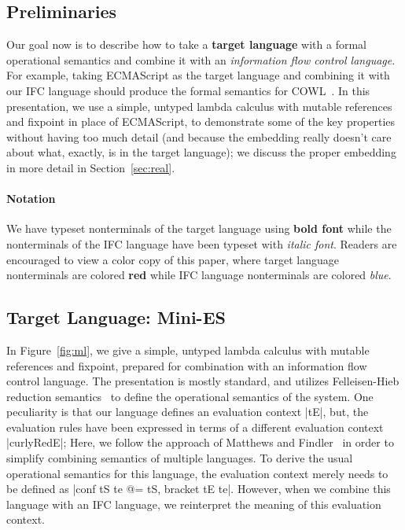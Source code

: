 \subsection{Preliminaries}

Our goal now is to
describe how to take a \textbf{{\color{red} target
language}} with a formal operational semantics and combine it with an
\textit{{\color{blue} information flow control language}}.  For example,
taking ECMAScript as the target language and combining it with our IFC
language should produce the formal semantics for COWL~\cite{swapi}.  In this
presentation, we use a simple, untyped lambda calculus with mutable
references and fixpoint in place of ECMAScript, to demonstrate some of the key
properties without having too much detail (and because the embedding really
doesn't care about what, exactly, is in the target language); we discuss the proper
embedding in more detail in Section~\ref{sec:real}.

\paragraph{Notation}
We have typeset nonterminals of the target language using \textbf{{\color{red}
bold font}} while the nonterminals of the IFC language have been typeset
with \textit{{\color{blue} italic font}}.  Readers are encouraged to view
a color copy of this paper, where target language nonterminals are colored \textbf{{\color{red} red}}
while IFC language nonterminals are colored \textit{{\color{blue} blue}}.

\subsection{Target Language: Mini-ES}

In Figure~\ref{fig:ml}, we give a simple, untyped lambda calculus with
mutable references and fixpoint, prepared for combination with an
information flow control language.  The presentation is mostly standard, and utilizes Felleisen-Hieb reduction
semantics~\cite{Felleisen:1992:RRS:136293.136297} to define the
operational semantics of the system.  One peculiarity is that our language
defines an evaluation context |tE|, but, the evaluation rules have been
expressed in terms of a different evaluation context |curlyRedE|;
Here, we follow the approach of Matthews and
Findler~\cite{Matthews:2007:OSM:1190216.1190220} in order to simplify combining
semantics of multiple languages.
To derive the usual operational semantics for this language, the evaluation
context merely needs to be defined as |conf tS te @= tS, bracket tE te|.
However, when we combine this language with an IFC language, we
reinterpret the meaning of this evaluation context.

